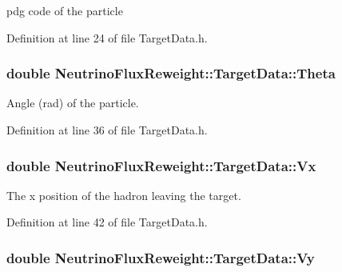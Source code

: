 pdg code of the particle 



Definition at line 24 of file Target\-Data.\-h.

\hypertarget{class_neutrino_flux_reweight_1_1_target_data_ac9cde1eb7d38015d22bb4004dc78a145}{
\subsubsection[{Theta}]{\setlength{\rightskip}{0pt plus 5cm}double Neutrino\-Flux\-Reweight\-::\-Target\-Data\-::\-Theta}}\label{class_neutrino_flux_reweight_1_1_target_data_ac9cde1eb7d38015d22bb4004dc78a145}


Angle (rad) of the particle. 



Definition at line 36 of file Target\-Data.\-h.

\hypertarget{class_neutrino_flux_reweight_1_1_target_data_aaeed3ae4abbd85643b22e100c29ca54e}{
\subsubsection[{Vx}]{\setlength{\rightskip}{0pt plus 5cm}double Neutrino\-Flux\-Reweight\-::\-Target\-Data\-::\-Vx}}\label{class_neutrino_flux_reweight_1_1_target_data_aaeed3ae4abbd85643b22e100c29ca54e}


The x position of the hadron leaving the target. 



Definition at line 42 of file Target\-Data.\-h.

\hypertarget{class_neutrino_flux_reweight_1_1_target_data_ad9e2ad215187911e6a23067f6cef3aec}{
\subsubsection[{Vy}]{\setlength{\rightskip}{0pt plus 5cm}double Neutrino\-Flux\-Reweight\-::\-Target\-Data\-::\-Vy}}\label{class_neutrino_flux_reweight_1_1_target_data_ad9e2ad215187911e6a23067f6cef3aec}


